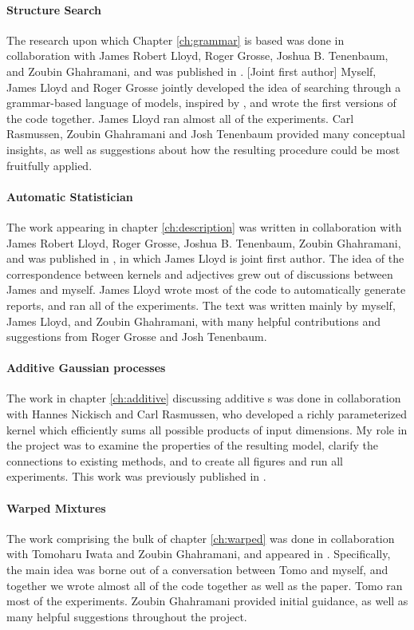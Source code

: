 \paragraph{Structure Search}
The research upon which Chapter \ref{ch:grammar} is based was done in collaboration with James Robert Lloyd, Roger Grosse, Joshua B. Tenenbaum, and Zoubin Ghahramani, and was published in \citep{DuvLloGroetal13}.
[Joint first author]
Myself, James Lloyd and Roger Grosse jointly developed the idea of searching through a grammar-based language of \gp{} models, inspired by \citet{grosse2012exploiting}, and wrote the first versions of the code together.
James Lloyd ran almost all of the experiments.
 Carl Rasmussen, Zoubin Ghahramani and Josh Tenenbaum provided many conceptual insights, as well as suggestions about how the resulting procedure could be most fruitfully applied.

\paragraph{Automatic Statistician} The work appearing in chapter \ref{ch:description} was written in collaboration with James Robert Lloyd, Roger Grosse, Joshua B. Tenenbaum, Zoubin Ghahramani, and was published in \citep{LloDuvGroetal14}, in which James Lloyd is joint first author.
The idea of the correspondence between kernels and adjectives grew out of discussions between James and myself.
James Lloyd wrote most of the code to automatically generate reports, and ran all of the experiments.
The text was written mainly by myself, James Lloyd, and Zoubin Ghahramani, with many helpful contributions and suggestions from Roger Grosse and Josh Tenenbaum.

\paragraph{Additive Gaussian processes}
The work in chapter \ref{ch:additive} discussing additive \gp{}s was done in collaboration with Hannes Nickisch and Carl Rasmussen, who developed a richly parameterized kernel which efficiently sums all possible products of input dimensions.
My role in the project was to examine the properties of the resulting model, clarify the connections to existing methods, and to create all figures and run all experiments.
This work was previously published in \citep{duvenaud2011additive11}.

\paragraph{Warped Mixtures}
The work comprising the bulk of chapter \ref{ch:warped} was done in collaboration with Tomoharu Iwata and Zoubin Ghahramani, and appeared in \citep{IwaDuvGha12}.
Specifically, the main idea was borne out of a conversation between Tomo and myself, and together we wrote almost all of the code together as well as the paper.
Tomo ran most of the experiments.
Zoubin Ghahramani provided initial guidance, as well as many helpful suggestions throughout the project.


